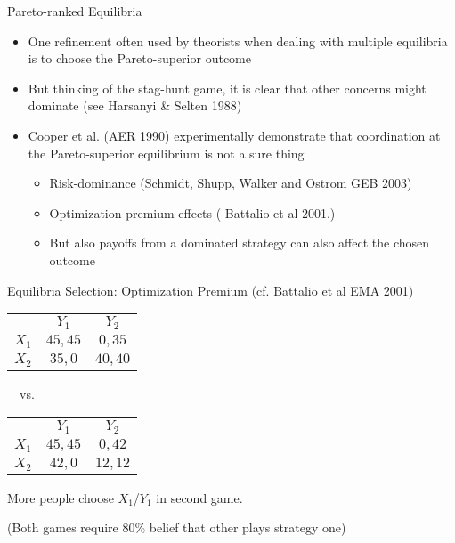 \documentclass{beamer}
\begin{document}
\begin{frame}{Pareto-ranked Equilibria}
	\begin{itemize}
		\item One refinement often used by theorists when dealing with multiple equilibria is to choose the Pareto-superior outcome
		\item But thinking of the stag-hunt game, it is clear that other concerns might dominate (see Harsanyi \& Selten 1988)
		\item Cooper et al. (AER 1990) experimentally demonstrate that coordination at the Pareto-superior equilibrium is not a sure thing
		\begin{itemize}
			\item Risk-dominance (Schmidt, Shupp, Walker and Ostrom GEB 2003)
			\item Optimization-premium effects ( Battalio et al 2001.)
			\item But also payoffs from a dominated strategy can also affect the chosen outcome
		\end{itemize}
	\end{itemize}
\end{frame}

\begin{frame}{Equilibria Selection: Optimization Premium (cf. Battalio et al EMA 2001)}
\begin{center}
\begin{tabular}{r|c|c|}
				\multicolumn{1}{r}{}& \multicolumn{1}{c}{$Y_1$}  & \multicolumn{1}{c}{$Y_2$} \\ \cline{2-3}
				$X_1$ &  $45,45$ & $0,35$ \\ \cline{2-3}
				$X_2$ &  $35,0$ & $40,40$ \\ \cline{2-3}
\end{tabular}
\ \ vs. \
\begin{tabular}{r|c|c|}
				\multicolumn{1}{r}{}& \multicolumn{1}{c}{$Y_1$}  & \multicolumn{1}{c}{$Y_2$} \\ \cline{2-3}
				$X_1$ &  $45,45$ & $0,42$ \\ \cline{2-3}
				$X_2$ &  $42,0$ & $12,12$ \\ \cline{2-3}
\end{tabular}
\end{center}
More people choose $X_1$/$Y_1$ in second game.

(Both games require 80\% belief that other plays strategy one)
\end{frame}
\end{document}
